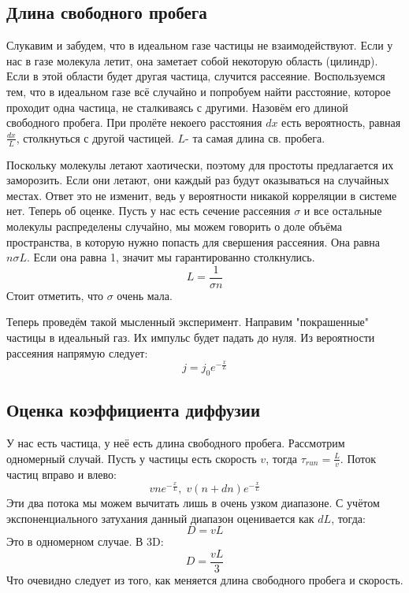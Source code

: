 \documentclass[a4paper, 12pt]{article}
\begin{document}
	\subsection{Длина свободного пробега}
	Слукавим и забудем, что в идеальном газе частицы не взаимодействуют. Если у нас в газе молекула летит, она заметает собой некоторую область (цилиндр). Если в этой области будет другая частица, случится рассеяние. Воспользуемся тем, что в идеальном газе всё случайно и попробуем найти расстояние, которое проходит одна частица, не сталкиваясь с другими. Назовём его длиной свободного пробега. При пролёте некоего расстояния $dx$ есть вероятность, равная $\frac{dx}{L}$, столкнуться с другой частицей. $L $- та самая длина св. пробега. 
	
	Поскольку молекулы летают хаотически, поэтому для простоты предлагается их заморозить. Если они летают, они каждый раз будут оказываться на случайных местах. Ответ это не изменит, ведь у вероятности никакой корреляции в системе нет. Теперь об оценке. Пусть у нас есть сечение рассеяния $\sigma$ и все остальные молекулы распределены случайно, мы можем говорить о доле объёма пространства, в которую нужно попасть для свершения рассеяния. Она равна $n \sigma L$. Если она равна 1, значит мы гарантированно столкнулись.
	\begin{equation*}
		L = \frac{1}{\sigma n}
	\end{equation*}
	Стоит отметить, что $\sigma$ очень мала. 
	
	Теперь проведём такой мысленный эксперимент. Направим "покрашенные" частицы в идеальный газ. Их импульс будет падать до нуля. Из вероятности рассеяния напрямую следует:
	\begin{equation*}
		j = j_{0} e^{-\frac{x}{L}}
	\end{equation*}
	\subsection{Оценка коэффициента диффузии}
	У нас есть частица, у неё есть длина свободного пробега. Рассмотрим одномерный случай. Пусть у частицы есть скорость $v$, тогда $\tau_{run} = \frac{L}{v}$. Поток частиц вправо и влево:
	\begin{equation*}
		vne^{-\frac{x}{L}} ,\; v(n+dn)e^{-\frac{x}{L}}
	\end{equation*}
	Эти два потока мы можем вычитать лишь в очень узком диапазоне. С учётом экспоненциального затухания данный диапазон оценивается как $dL$, тогда:
	\begin{equation*}
		D = vL
	\end{equation*}
	Это в одномерном случае. В 3D:
	\begin{equation*}
		D = \frac{vL}{3}
	\end{equation*}
	Что очевидно следует из того, как меняется длина свободного пробега и скорость.
\end{document}
